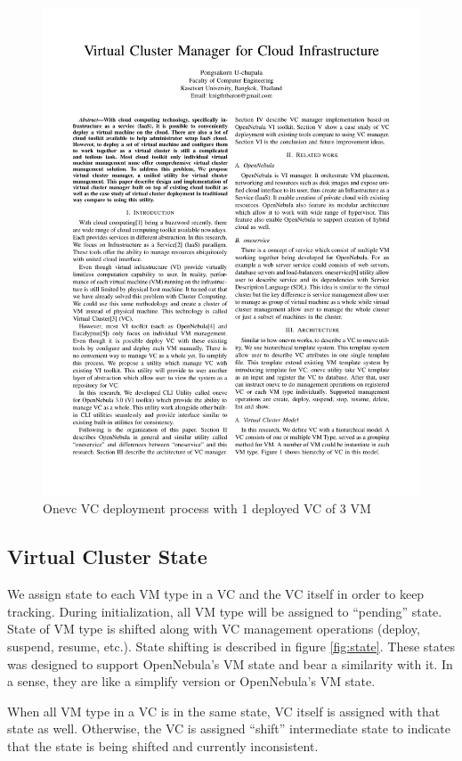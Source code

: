 \documentclass[conference]{IEEEtran}
\begin{document}
\begin{figure}[!t]
\centering
\includegraphics[width=6.5in]{onevc}
\caption{Onevc VC deployment process with 1 deployed VC of 3 VM}
\label{fig:onevc}
\end{figure}

\subsection{Virtual Cluster State}
We assign state to each VM type in a VC and the VC itself in order to keep tracking.
During initialization, all VM type will be assigned to ``pending'' state.
State of VM type is shifted along with VC management operations (deploy, suspend, resume, etc.).
State shifting is described in figure \ref{fig:state}.
These states was designed to support OpenNebula's VM state\cite{opennebula-state} and bear a similarity with it.
In a sense, they are like a simplify version or OpenNebula's VM state.

When all VM type in a VC is in the same state, VC itself is assigned with that state as well.
Otherwise, the VC is assigned ``shift'' intermediate state to indicate that the state is being shifted and currently inconsistent.
\end{document}
